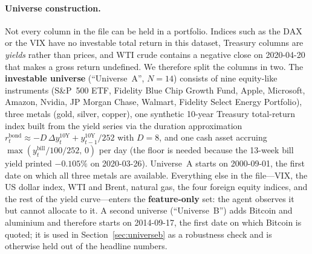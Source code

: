 \documentclass[11pt]{article}
\begin{document}
\paragraph{Universe construction.}
Not every column in the file can be held in a portfolio. Indices such as the DAX or the VIX
have no investable total return in this dataset, Treasury columns are \emph{yields} rather than
prices, and WTI crude contains a negative close on 2020-04-20 that makes a gross return
undefined. We therefore split the columns in two. The \textbf{investable universe}
(``Universe~A'', $N=14$) consists of nine equity-like instruments (S\&P~500 ETF, Fidelity Blue
Chip Growth Fund, Apple, Microsoft, Amazon, Nvidia, JP Morgan Chase, Walmart, Fidelity Select
Energy Portfolio), three metals (gold, silver, copper), one synthetic 10-year Treasury
total-return index built from the yield series via the duration approximation
$r^{\text{bond}}_t \approx -D\,\Delta y^{10\text{Y}}_t + y^{10\text{Y}}_{t-1}/252$ with $D=8$,
and one cash asset accruing $\max(y^{\text{bill}}_t/100/252,\,0)$ per day (the floor is needed
because the 13-week bill yield printed $-0.105\%$ on 2020-03-26). Universe~A starts on
2000-09-01, the first date on which all three metals are available. Everything else in the
file---VIX, the US dollar index, WTI and Brent, natural gas, the four foreign equity indices,
and the rest of the yield curve---enters the \textbf{feature-only} set: the agent observes it
but cannot allocate to it. A second universe (``Universe~B'') adds Bitcoin and aluminium and
therefore starts on 2014-09-17, the first date on which Bitcoin is quoted; it is used in
Section~\ref{sec:universeb} as a robustness check and is otherwise held out of the headline
numbers.
\end{document}
